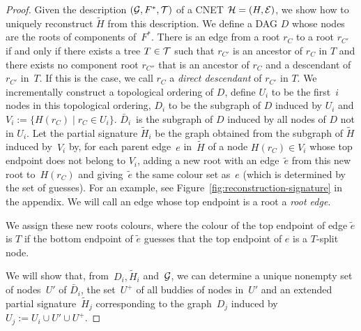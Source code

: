 \begin{proof}
  Given the description $(\mathcal{G}, F^*, \mathcal{T})$ of a CNET
  $\mathcal{H} = (H, \mathcal{E})$, we show how to uniquely reconstruct $\tilde H$ from this
  description.
  We define a DAG $D$ whose nodes are the roots of {components of}~$F^*$.
  There is an edge from a root $r_C$ to a root $r_{C'}$ if and only if there
  exists a tree $T \in \mathcal{T}$ such that $r_{C'}$ is an ancestor of $r_C$ in $T$
  and there exists no component root $r_{C''}$ that is an ancestor of $r_C$ and
  a descendant of $r_{C'}$ in~$T$.
  If this is the case, we call $r_C$ a \emph{direct descendant} of $r_{C'}$ in $T$.
  We incrementally construct a topological ordering of $D$, define $U_i$ to be the first~$i$ nodes in this topological ordering, $D_i$ to
  be the subgraph of $D$ induced by $U_i$ and $V_i := \{ H(r_C) \mid r_C \in U_i\}$.
  $\bar D_i$~is the subgraph of $D$ induced by all nodes of $D$ not in $U_i$. Let {the partial signature} $\tilde H_i$ be the graph obtained from the subgraph of $\tilde H$ induced by~$V_i$ by, for each parent edge~$e$ in~$\tilde H$ of a node $H(r_C) \in V_i$ whose top endpoint does not belong to $V_i$, adding a new root with an edge~$\tilde e$ from this new root to~$H(r_C)$ and giving~$\tilde e$ the same colour set as~$e$ (which is determined by the set of guesses). {For an example, see Figure~\ref{fig:reconstruction-signature} in the appendix.} We will call an edge whose top endpoint is a root a \emph{root edge}.
	
  

  We assign these new roots colours, where the colour of the top endpoint
  of edge $\tilde e$ is $T$ if the bottom endpoint of $\tilde e$ guesses that the top endpoint of $e$ is a $T$-split node.
  
We will show that, from~$D_i, \tilde H_i$ and~$\mathcal{G}$, we can determine a unique nonempty set of nodes~$U'$ of $\bar D_i$, the set~$U^+$ of all buddies of nodes in~$U'$ and {an extended partial signature}~$\tilde H_j$ corresponding to the graph~$D_j$ induced by~$U_j:=U_i\cup U' \cup U^+$.
  

\end{proof}
